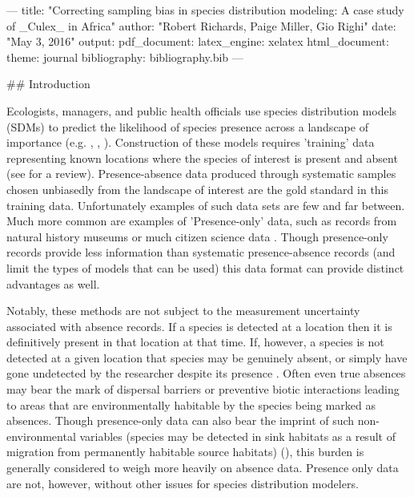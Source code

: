 ---
title: "Correcting sampling bias in species distribution modeling: A case study of _Culex_ in Africa"
author: "Robert Richards, Paige Miller, Gio Righi"
date: "May 3, 2016"
output:
  pdf_document:
    latex_engine: xelatex
  html_document:
    theme: journal
bibliography: bibliography.bib
---

## Introduction

Ecologists, managers, and public health oﬃcials use species distribution models (SDMs) to predict the likelihood of species presence across a landscape of importance (e.g. \cite{Drake:2014fk}, \cite{Hamazaki:2002jq}, \cite{GUISAN:2005gz}). Construction of these models requires 'training' data representing known locations where the species of interest is present and absent (see \cite{GUISAN:2000hy} for a review). Presence-absence data produced through systematic samples chosen unbiasedly from the landscape of interest are the gold standard in this training data. Unfortunately examples of such data sets are few and far between. Much more common are examples of 'Presence-only' data, such as records from natural history museums or much citizen science data \cite{GRAHAM:2004gt}. Though presence-only records provide less information than systematic presence-absence records (and limit the types of models that can be used) this data format can provide distinct advantages as well. 


Notably, these methods are not subject to the measurement uncertainty associated with absence records. If a species is detected at a location then it is deﬁnitively present in that location at that time. If, however, a species is not detected at a given location that species may be genuinely absent, or simply have gone undetected by the researcher despite its presence \cite{Gu:2004hz}. Often even true absences may bear the mark of dispersal barriers or preventive biotic interactions leading to areas that are environmentally habitable by the species being marked as absences. Though presence-only data can also bear the imprint of such non-environmental variables (species may be detected in sink habitats as a result of migration from permanently habitable source habitats) (\cite{Pulliam:2000gh}), this burden is generally considered to weigh more heavily on absence data. Presence only data are not, however, without other issues for species distribution modelers. 

